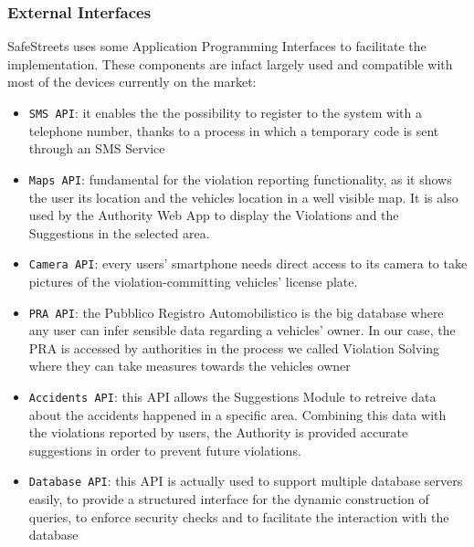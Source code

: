 \documentclass[12pt,a4paper]{article}
\begin{document}
\subsubsection{External Interfaces}
SafeStreets uses some Application Programming Interfaces to facilitate the implementation. These components are infact largely used and compatible with most of the devices currently on the market:
\begin{itemize}
\item \texttt{SMS API}: it enables the the possibility to register to the system with a telephone number, thanks to a process in which a temporary code is sent through an SMS Service
\item \texttt{Maps API}: fundamental for the violation reporting functionality, as it shows the user its location and the vehicles location in a well visible map. It is also used by the Authority Web App to display the Violations and the Suggestions in the selected area.
\item \texttt{Camera API}: every users' smartphone needs direct access to its camera to take pictures of the violation-committing vehicles' license plate.
\item \texttt{PRA API}: the Pubblico Registro Automobilistico is the big database where any user can infer sensible data regarding a vehicles' owner. In our case, the PRA is accessed by authorities in the process we called Violation Solving where they can take measures towards the vehicles owner
\item \texttt{Accidents API}: this API allows the Suggestions Module to retreive data about the accidents happened in a specific area. Combining this data with the violations reported by users, the Authority is provided accurate suggestions in order to prevent future violations.
\item \texttt{Database API}: this API is actually used to support multiple database servers easily, to provide a structured interface for the dynamic construction of queries, to enforce security checks and to facilitate the interaction with the database
\end{itemize}
\newpage
\end{document}
